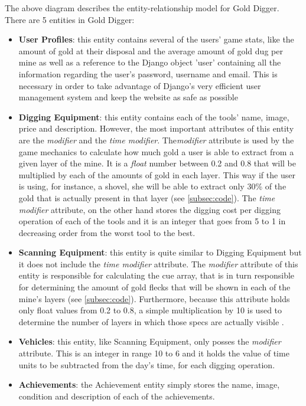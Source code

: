 \documentclass{mproj}
\begin{document}
The above diagram describes the entity-relationship model for Gold Digger. There are 5 entities in Gold Digger:
\begin{itemize}
	\item \textbf{User Profiles}: this entity contains several of the users' game stats, like the amount of gold at their disposal and the average amount of gold dug per mine as well as a reference to the Django object 'user' containing all the information regarding the user's password, username and email. This is necessary in order to take advantage of Django's very efficient user management system and keep the website as safe as possible 

  	\item \textbf{Digging Equipment}: this entity contains each of the tools' name, image, price and description. However, the most important attributes of this entity are the \textit{modifier} and the \textit{time modifier}. The\textit{modifier} attribute is used by the game mechanics to calculate how much gold a user is able to extract from a given layer of the mine. It is a \textit{float} number between 0.2 and 0.8  that will be multiplied by each of the amounts of gold in each layer. This way if the user is using, for instance, a shovel, she will be able to extract only 30\% of the gold that is actually present in that layer (see \ref{subsec:code}). The \textit{time modifier} attribute, on the other hand stores the digging cost per digging operation of each of the tools and it is an integer that goes from 5 to 1 in decreasing order from the worst tool to the best.

  	\item \textbf{Scanning Equipment}: this entity is quite similar to Digging Equipment but it does not include the \textit{time modifier} attribute. The \textit{modifier} attribute of this entity is responsible for calculating the cue array, that is in turn responsible for determining the amount of gold flecks that will be shown in each of the mine's layers (see \ref{subsec:code}). Furthermore, because this attribute holds only float values from 0.2 to 0.8, a simple multiplication by 10 is used  to determine the number of layers in which those specs are actually visible  .

	\item \textbf{Vehicles}: this entity, like Scanning Equipment, only posses the  \textit{modifier} attribute. This is an integer in range 10 to 6 and it holds the value of time units to be subtracted from the day's time, for each digging operation.  
	\item \textbf{Achievements}: the Achievement entity simply stores the name, image, condition and description of each of the achievements.
\end{itemize} 
\end{document}
